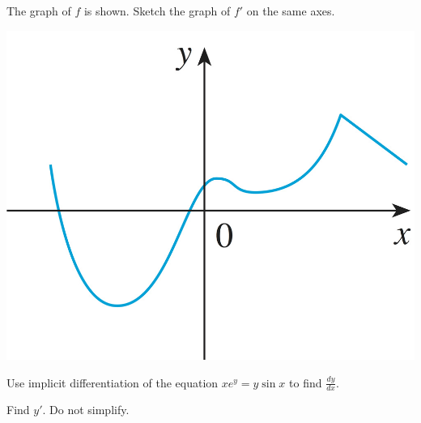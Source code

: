 \documentclass[12pt, addpoints]{exam/exam}
\newcommand{\1}{^{-1}}
\theoremstyle{plain}
\begin{document}
\begin{questions}

\question[3]%
The graph of $f$ is shown.  Sketch the graph of $f'$ on the same axes.
\begin{center}
\includegraphics[scale=5]{2Rev_44Stewart8Ed.jpg}
\end{center}
	
\question[3]%
Use implicit differentiation of the equation $xe^y=y\sin x$ to find $\frac{dy}{dx}$.
\vspace{8pc}

\question Find $y'$.  Do not simplify.
	\begin{parts}

\end{parts}
\end{questions}
\end{document}
